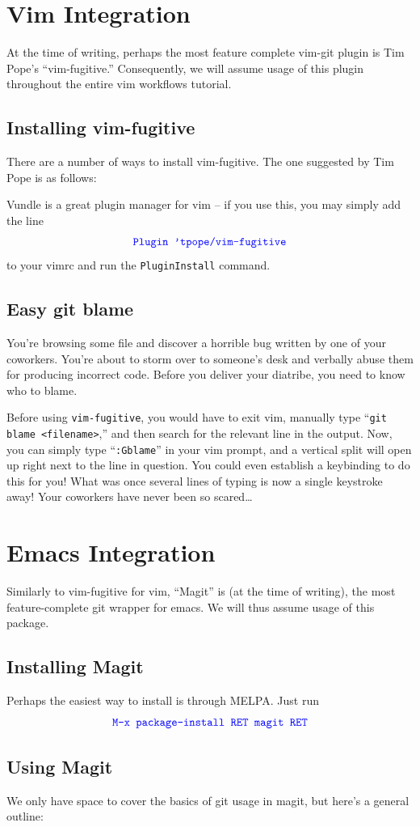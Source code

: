 \documentclass[12pt]{report}
\newcommand\code[1]{{\color{blue}\texttt{#1}}}
\begin{document}
\chapter{Vim Integration}

At the time of writing, perhaps the most feature complete vim-git
plugin is Tim Pope’s “vim-fugitive.” Consequently, we will assume
usage of this plugin throughout the entire vim workflows tutorial.

\section{Installing vim-fugitive}

There are a number of ways to install vim-fugitive. The one suggested
by Tim Pope is as follows:
Vundle is a great plugin manager for vim -- if you use this, you may
simply add the line
\[
  \code{Plugin 'tpope/vim-fugitive}
\]
to your vimrc and run the \code{PluginInstall} command.

\section{Easy git blame}
You’re browsing some file and discover a horrible bug written by one
of your coworkers. You’re about to storm over to someone’s desk and
verbally abuse them for producing incorrect code. Before you deliver
your diatribe, you need to know who to blame.

Before using \texttt{vim-fugitive}, you would have to exit vim,
manually type “\code{git blame <filename>},” and then search for the
relevant line in the output. Now, you can simply type
“\code{:Gblame}” in your vim prompt, and a vertical split will open
up right next to the line in question. You could even establish a
keybinding to do this for you! What was once several lines of typing
is now a single keystroke away! Your coworkers have never been so
scared\ldots

\chapter{Emacs Integration}

Similarly to vim-fugitive for vim, “Magit” is (at the time of
writing), the most feature-complete git wrapper for emacs. We will
thus assume usage of this package.

\section{Installing Magit}
Perhaps the easiest way to install is through MELPA. Just run
\[
  \code{M-x package-install RET magit RET}
\]

\section{Using Magit}
We only have space to cover the basics of git usage in magit, but
here’s a general outline:
\end{document}
